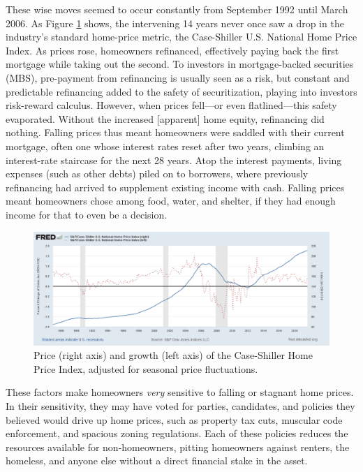 \documentclass[12pt,oneside]{psthesis}
\begin{document}
These wise moves seemed to occur constantly from September 1992 until March 2006.
As Figure \ref{fig:caseshiller} shows, the intervening 14 years never once saw a drop in the industry's standard home-price metric, the Case-Shiller U.S. National Home Price Index.
As prices rose, homeowners refinanced, effectively paying back the first mortgage while taking out the second.
To investors in mortgage-backed securities (MBS), pre-payment from refinancing is usually seen as a risk, but constant and predictable refinancing added to the safety of securitization, playing into investors risk-reward calculus.
However, when prices fell---or even flatlined---this safety evaporated.
Without the increased {[}apparent{]} home equity, refinancing did nothing.
Falling prices thus meant homeowners were saddled with their current mortgage, often one whose interest rates reset after two years, climbing an interest-rate staircase for the next 28 years.
Atop the interest payments, living expenses (such as other debts) piled on to borrowers, where previously refinancing had arrived to supplement existing income with cash.
Falling prices meant homeowners chose among food, water, and shelter, if they had enough income for that to even be a decision.
\begin{figure}

{\centering \includegraphics[width=0.9\linewidth]{figure/caseshiller_1990_2018} 

}

\caption{Price (right axis) and growth (left axis) of the Case-Shiller Home Price Index, adjusted for seasonal price fluctuations.}\label{fig:caseshiller}
\end{figure}
These factors make homeowners \emph{very} sensitive to falling or stagnant home prices.
In their sensitivity, they may have voted for parties, candidates, and policies they believed would drive up home prices, such as property tax cuts, muscular code enforcement, and spacious zoning regulations.
Each of these policies reduces the resources available for non-homeowners, pitting homeowners against renters, the homeless, and anyone else without a direct financial stake in the asset.
\end{document}
